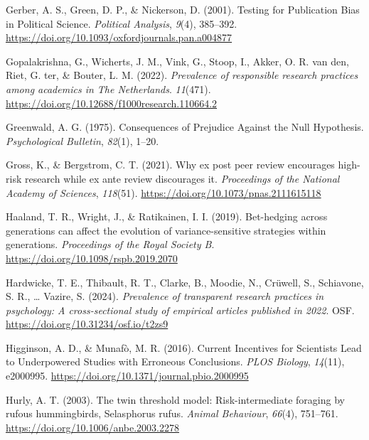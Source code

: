 \documentclass[
  ,man,mask,floatsintext]{apa6}
\newlength{\cslhangindent}
\newlength{\cslentryspacingunit} %
\newenvironment{CSLReferences}[2] %
 {%
  \setlength{\parindent}{0pt}
  \ifodd #1
  \let\oldpar\par
  \def\par{\hangindent=\cslhangindent\oldpar}
  \fi
  \setlength{\parskip}{#2\cslentryspacingunit}
 }%
 {}
\begin{document}
\begin{CSLReferences}{1}{0}
\leavevmode{}%
Gerber, A. S., Green, D. P., \& Nickerson, D. (2001). Testing for {Publication Bias} in {Political Science}. \emph{Political Analysis}, \emph{9}(4), 385--392. \url{https://doi.org/10.1093/oxfordjournals.pan.a004877}

\leavevmode{}%
Gopalakrishna, G., Wicherts, J. M., Vink, G., Stoop, I., Akker, O. R. van den, Riet, G. ter, \& Bouter, L. M. (2022). \emph{Prevalence of responsible research practices among academics in {The Netherlands}}. \emph{11}(471). \url{https://doi.org/10.12688/f1000research.110664.2}

\leavevmode{}%
Greenwald, A. G. (1975). Consequences of {Prejudice Against} the {Null Hypothesis}. \emph{Psychological Bulletin}, \emph{82}(1), 1--20.

\leavevmode{}%
Gross, K., \& Bergstrom, C. T. (2021). Why ex post peer review encourages high-risk research while ex ante review discourages it. \emph{Proceedings of the National Academy of Sciences}, \emph{118}(51). \url{https://doi.org/10.1073/pnas.2111615118}

\leavevmode{}%
Haaland, T. R., Wright, J., \& Ratikainen, I. I. (2019). Bet-hedging across generations can affect the evolution of variance-sensitive strategies within generations. \emph{Proceedings of the Royal Society B}. \url{https://doi.org/10.1098/rspb.2019.2070}

\leavevmode{}%
Hardwicke, T. E., Thibault, R. T., Clarke, B., Moodie, N., Crüwell, S., Schiavone, S. R., \ldots{} Vazire, S. (2024). \emph{Prevalence of transparent research practices in psychology: {A} cross-sectional study of empirical articles published in 2022}. OSF. \url{https://doi.org/10.31234/osf.io/t2zs9}

\leavevmode{}%
Higginson, A. D., \& Munafò, M. R. (2016). Current {Incentives} for {Scientists Lead} to {Underpowered Studies} with {Erroneous Conclusions}. \emph{PLOS Biology}, \emph{14}(11), e2000995. \url{https://doi.org/10.1371/journal.pbio.2000995}

\leavevmode{}%
Hurly, A. T. (2003). The twin threshold model: Risk-intermediate foraging by rufous hummingbirds, {Selasphorus} rufus. \emph{Animal Behaviour}, \emph{66}(4), 751--761. \url{https://doi.org/10.1006/anbe.2003.2278}


\end{CSLReferences}
\end{document}
